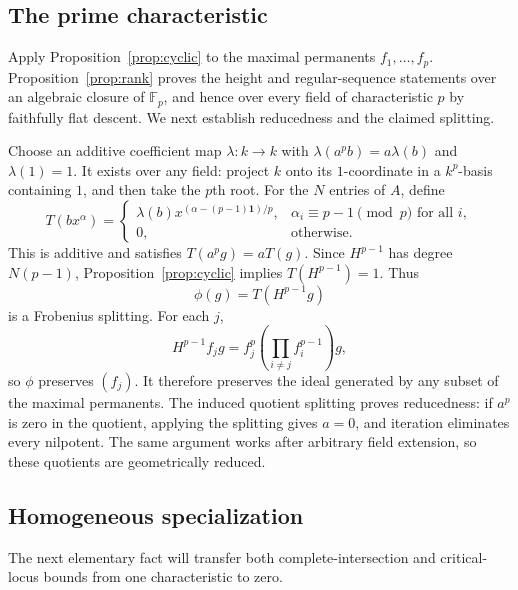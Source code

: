 \documentclass[11pt]{article}
\theoremstyle{definition}\newtheorem{definition}[theorem]{Definition}
\theoremstyle{remark}\newtheorem{remark}[theorem]{Remark}
\newcommand{\F}{\mathbb F}
\numberwithin{equation}{section}
\begin{document}
\subsection{The prime characteristic}
Apply Proposition~\ref{prop:cyclic} to the maximal permanents
$f_1,\ldots,f_p$. Proposition~\ref{prop:rank} proves the height
and regular-sequence statements over an algebraic closure of $\F_p$,
and hence over every field of characteristic $p$ by faithfully flat
descent. We next establish reducedness and the claimed splitting.

Choose an additive coefficient map $\lambda:k\to k$ with
$\lambda(a^pb)=a\lambda(b)$ and $\lambda(1)=1$. It exists over
any field: project $k$ onto its $1$-coordinate in a $k^p$-basis
containing $1$, and then take the $p$th root. For the $N$ entries
of $A$, define
\[
 T(bx^{\alpha})=
 \begin{cases}
 \lambda(b)x^{(\alpha-(p-1)\boldsymbol1)/p},
    &\alpha_i\equiv p-1\pmod p\text{ for all }i,\\
 0,&\text{otherwise}.
 \end{cases}
\]
This is additive and satisfies $T(a^pg)=aT(g)$. Since $H^{p-1}$
has degree $N(p-1)$, Proposition~\ref{prop:cyclic} implies
$T(H^{p-1})=1$. Thus
\begin{equation}\label{eq:splitting}
 \phi(g)=T(H^{p-1}g)
\end{equation}
is a Frobenius splitting. For each $j$,
\[
 H^{p-1}f_jg=f_j^p\left(\prod_{i\ne j}f_i^{p-1}\right)g,
\]
so $\phi$ preserves $(f_j)$. It therefore preserves the ideal
generated by any subset of the maximal permanents. The induced
quotient splitting proves reducedness: if $a^p$ is zero in the
quotient, applying the splitting gives $a=0$, and iteration eliminates
every nilpotent. The same argument works after arbitrary field
extension, so these quotients are geometrically reduced.

\subsection{Homogeneous specialization}
The next elementary fact will transfer both complete-intersection
and critical-locus bounds from one characteristic to zero.
\end{document}

